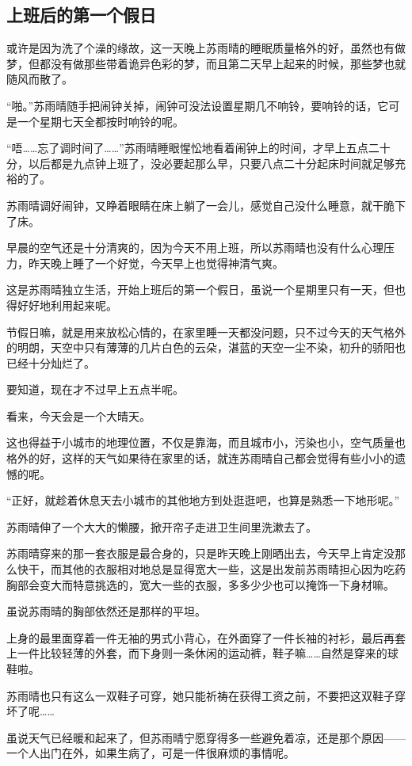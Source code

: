 \subsection{上班后的第一个假日}

或许是因为洗了个澡的缘故，这一天晚上苏雨晴的睡眠质量格外的好，虽然也有做梦，但都没有做那些带着诡异色彩的梦，而且第二天早上起来的时候，那些梦也就随风而散了。

“啪。”苏雨晴随手把闹钟关掉，闹钟可没法设置星期几不响铃，要响铃的话，它可是一个星期七天全都按时响铃的呢。

“唔……忘了调时间了……”苏雨晴睡眼惺忪地看着闹钟上的时间，才早上五点二十分，以后都是九点钟上班了，没必要起那么早，只要八点二十分起床时间就足够充裕的了。

苏雨晴调好闹钟，又睁着眼睛在床上躺了一会儿，感觉自己没什么睡意，就干脆下了床。

早晨的空气还是十分清爽的，因为今天不用上班，所以苏雨晴也没有什么心理压力，昨天晚上睡了一个好觉，今天早上也觉得神清气爽。

这是苏雨晴独立生活，开始上班后的第一个假日，虽说一个星期里只有一天，但也得好好地利用起来呢。

节假日嘛，就是用来放松心情的，在家里睡一天都没问题，只不过今天的天气格外的明朗，天空中只有薄薄的几片白色的云朵，湛蓝的天空一尘不染，初升的骄阳也已经十分灿烂了。

要知道，现在才不过早上五点半呢。

看来，今天会是一个大晴天。

这也得益于小城市的地理位置，不仅是靠海，而且城市小，污染也小，空气质量也格外的好，这样的天气如果待在家里的话，就连苏雨晴自己都会觉得有些小小的遗憾的呢。

“正好，就趁着休息天去小城市的其他地方到处逛逛吧，也算是熟悉一下地形呢。”

苏雨晴伸了一个大大的懒腰，掀开帘子走进卫生间里洗漱去了。

苏雨晴穿来的那一套衣服是最合身的，只是昨天晚上刚晒出去，今天早上肯定没那么快干，而其他的衣服相对地总是显得宽大一些，这是出发前苏雨晴担心因为吃药胸部会变大而特意挑选的，宽大一些的衣服，多多少少也可以掩饰一下身材嘛。

虽说苏雨晴的胸部依然还是那样的平坦。

上身的最里面穿着一件无袖的男式小背心，在外面穿了一件长袖的衬衫，最后再套上一件比较轻薄的外套，而下身则一条休闲的运动裤，鞋子嘛……自然是穿来的球鞋啦。

苏雨晴也只有这么一双鞋子可穿，她只能祈祷在获得工资之前，不要把这双鞋子穿坏了呢……

虽说天气已经暖和起来了，但苏雨晴宁愿穿得多一些避免着凉，还是那个原因——一个人出门在外，如果生病了，可是一件很麻烦的事情呢。

